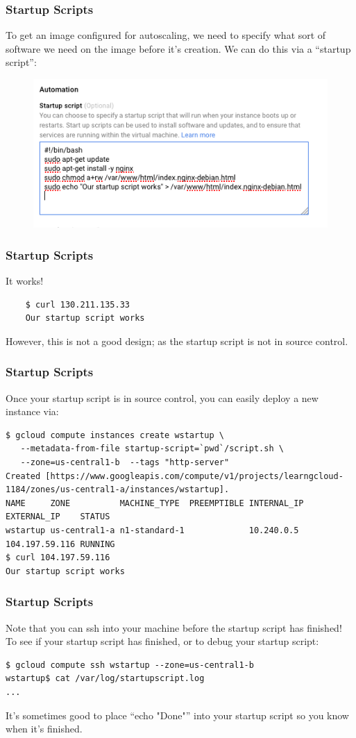 \documentclass[9pt]{beamer}
\begin{document}
\begin{frame}[fragile]
  \frametitle{Startup Scripts}
  To get an image configured for autoscaling, we need to specify what sort of software we need on the image before it's creation. We can do this via a ``startup script'':
  \begin{figure}
    \includegraphics[scale=0.3]{figures/StartupScript.png}
  \end{figure}
\end{frame}

\begin{frame}[fragile]
	\frametitle{Startup Scripts}
	It works!
	\begin{verbatim}
	$ curl 130.211.135.33
	Our startup script works
	\end{verbatim}
	However, this is not a good design; as the startup script is not in source control.
\end{frame}

\begin{frame}[fragile]
\frametitle{Startup Scripts}
Once your startup script is in source control, you can easily deploy a new instance via:
\begin{verbatim}
$ gcloud compute instances create wstartup \
   --metadata-from-file startup-script=`pwd`/script.sh \
   --zone=us-central1-b  --tags "http-server"
Created [https://www.googleapis.com/compute/v1/projects/learngcloud-1184/zones/us-central1-a/instances/wstartup].
NAME     ZONE          MACHINE_TYPE  PREEMPTIBLE INTERNAL_IP EXTERNAL_IP    STATUS
wstartup us-central1-a n1-standard-1             10.240.0.5  104.197.59.116 RUNNING
$ curl 104.197.59.116
Our startup script works
\end{verbatim}
\end{frame}

\begin{frame}[fragile]
\frametitle{Startup Scripts}
Note that you can ssh into your machine before the startup script has finished! To see if your startup script has finished, or to debug your startup script:
\begin{verbatim}
$ gcloud compute ssh wstartup --zone=us-central1-b
wstartup$ cat /var/log/startupscript.log
...
\end{verbatim}
It's sometimes good to place ``echo "Done"'' into your startup script so you know when it's finished.
\end{frame}
\end{document}

